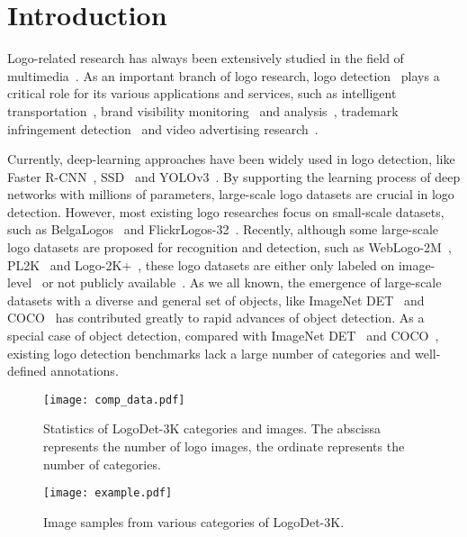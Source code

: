 \documentclass[journal]{IEEEtran}
\begin{document}
\IEEEpeerreviewmaketitle

\section{Introduction}
Logo-related research has always been extensively studied in the field of multimedia~\cite{Brand14, Romberg2011Scalable, Revaud2012Correlation, Kalantidis2011STL, Romberg2013Bundle}. As an important branch of logo research, logo detection~\cite{Automatic2005Yan, Region2016, Eggert2017Improving} plays a critical role for its various applications and services, such as intelligent transportation~\cite{Yang2015Car}, brand visibility monitoring~\cite{Filtering2016gao} and analysis~\cite{Visual18}, trademark infringement detection~\cite{Brand14} and video advertising research~\cite{Video2017cheng}.

Currently, deep-learning approaches have been widely used in logo detection, like Faster R-CNN~\cite{Ren2015}, SSD~\cite{liu2016ssd} and YOLOv3~\cite{Joseph2018Yolov3}. By supporting the learning process of deep networks with millions of parameters, large-scale logo  datasets are crucial in logo detection. However, most existing logo researches focus on small-scale datasets, such as BelgaLogos~\cite{Neumann2001Integration} and FlickrLogos-32~\cite{Romberg2011Scalable}. Recently, although some large-scale logo datasets are proposed for recognition and detection, such as WebLogo-2M~\cite{Su2017WebLogo}, PL2K~\cite{II2019Scalable} and Logo-2K+~\cite{Wang2020Logo2K}, these logo datasets are  either only labeled on image-level~\cite{Su2017WebLogo, Wang2020Logo2K} or not publicly available~\cite{II2019Scalable}. As we all known, the emergence of large-scale  datasets with a diverse and general set of objects, like ImageNet DET~\cite{Deng-ImageNet-CVPR2009} and COCO~\cite{Lin2014COCO} has contributed greatly to rapid advances of object detection. As a special case of object detection, compared with  ImageNet DET~\cite{Deng-ImageNet-CVPR2009} and COCO~\cite{Lin2014COCO}, existing logo detection benchmarks lack a large number of categories and well-defined annotations.
\begin{figure}[!t]
	\centering
	\texttt{[image: comp\_data.pdf]}
	\caption{Statistics of LogoDet-3K categories and images. The abscissa represents the number of logo images, the ordinate represents the number of categories.}
	\label{comp_points_classes}
\end{figure}

\begin{figure*}[!t]
	\centering
	\texttt{[image: example.pdf]}
	\caption{Image samples from various categories of LogoDet-3K.}
	\label{logo_category_samples}
\end{figure*}
\end{document}
